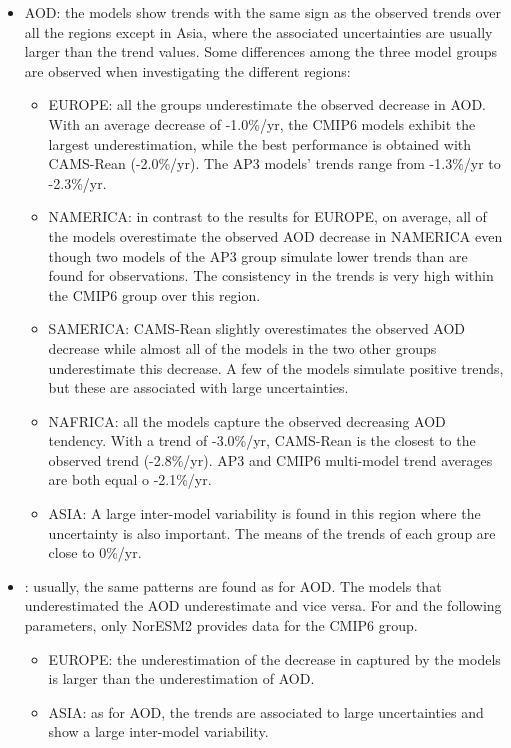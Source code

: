 \documentclass[acp, manuscript]{copernicus}
\begin{document}
\begin{itemize}
 \item AOD: the models show trends with the same sign as the observed trends over all the regions except in Asia, where the associated uncertainties are usually larger than the trend values. Some differences among the three model groups are observed when investigating the different regions:
       \begin{itemize}
        \item EUROPE: all the groups underestimate the observed decrease in AOD. With an average decrease of -1.0\%/yr, the CMIP6 models exhibit the largest underestimation, while the best performance is obtained with CAMS-Rean (-2.0\%/yr). The AP3 models' trends range from -1.3\%/yr to -2.3\%/yr.
        \item NAMERICA: in contrast to the results for EUROPE, on average, all of the models overestimate the observed AOD decrease in NAMERICA even though two models of the AP3 group simulate lower trends than are found for observations. The consistency in the trends is very high within the CMIP6 group over this region.
        \item SAMERICA: CAMS-Rean slightly overestimates the observed AOD decrease while almost all of the models in the two other groups underestimate this decrease. A few of the models simulate positive trends, but these are associated with large uncertainties.
        \item NAFRICA: all the models capture the observed decreasing AOD tendency. With a trend of -3.0\%/yr, CAMS-Rean is the closest to the observed trend (-2.8\%/yr). AP3 and CMIP6 multi-model trend averages are both equal o -2.1\%/yr.
        \item ASIA: A large inter-model variability is found in this region where the uncertainty is also important. The means of the trends of each group are close to 0\%/yr.
       \end{itemize}
 \item {}: usually, the same patterns are found as for AOD. The models that underestimated the AOD underestimate  and vice versa. For  and the following parameters, only NorESM2 provides data for the CMIP6 group.
       \begin{itemize}
        \item EUROPE: the underestimation of the decrease in  captured by the models is larger than the underestimation of AOD.
        \item ASIA: as for AOD, the trends are associated to large uncertainties and show a large inter-model variability.

\end{itemize}
\end{itemize}
\end{document}

